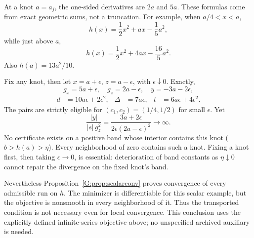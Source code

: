At a knot $a=a_j$, the one-sided derivatives are $2a$ and $5a$. These formulas come from exact geometric sums, not a truncation. For example, when $a/4<x<a$,
\[
 h(x)=\frac12x^2+ax-\frac15a^2,
\]
while just above $a$,
\[
 h(x)=\frac12x^2+4ax-\frac{16}{5}a^2.
\]
Also $h(a)=13a^2/10$.

Fix any knot, then let $x=a+\epsilon$, $z=a-\epsilon$, with $\epsilon\downarrow0$. Exactly,
\[
 g_x=5a+\epsilon,\quad g_z=2a-\epsilon,\quad y=-3a-2\epsilon,
\]
\begin{align*}
 d&=10a\epsilon+2\epsilon^2,&
 \Delta&=7a\epsilon,&
 t&=6a\epsilon+4\epsilon^2.
\end{align*}
The pairs are strictly eligible for $(c_1,c_2)=(1/4,1/2)$ for small $\epsilon$. Yet
\[
 \frac{|y|}{|s|\,g_z^2}
 =\frac{3a+2\epsilon}{2\epsilon(2a-\epsilon)^2}\longrightarrow\infty.
\]
No certificate exists on a positive band whose interior contains this knot ($b>h(a)>\eta$). Every neighborhood of zero contains such a knot. Fixing a knot first, then taking $\epsilon\to0$, is essential: deterioration of band constants as $\eta\downarrow0$ cannot repair the divergence on the fixed knot's band.

Nevertheless Proposition~\ref{G:prop:scalarconv} proves convergence of every admissible run on $h$. The minimizer is differentiable for this scalar example, but the objective is nonsmooth in every neighborhood of it. Thus the transported condition is not necessary even for local convergence. This conclusion uses the explicitly defined infinite-series objective above; no unspecified archived auxiliary is needed.


\setcounter{section}{8}
\setcounter{theorem}{0}
\setcounter{equation}{8}


